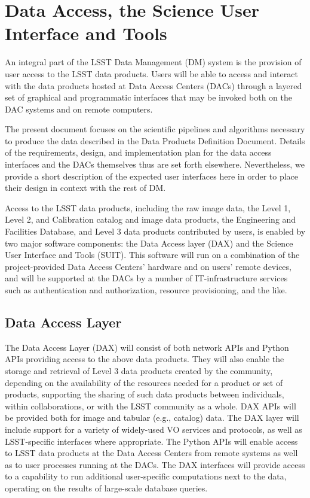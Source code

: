 \section{Data Access, the Science User Interface and Tools}
\label{sec:suit}

An integral part of the LSST Data Management (DM) system is the provision of user access to the 
LSST data products. Users will be able to access and interact with the data products hosted at 
Data Access Centers (DACs) through a layered set of graphical and programmatic interfaces that 
may be invoked both on the DAC systems and on remote computers.

The present document focuses on the scientific pipelines and algorithms necessary to produce 
the data described in the Data Products Definition Document. Details of the requirements, design, 
and implementation plan for the data access interfaces and the DACs themselves thus are set forth 
elsewhere. Nevertheless, we provide a short description of the expected user interfaces here in order 
to place their design in context with the rest of DM.

Access to the LSST data products, including the raw image data, the Level 1, Level 2, and Calibration 
catalog and image data products, the Engineering and Facilities Database, and Level 3 data products 
contributed by users, is enabled by two major software components: the Data Access layer (DAX) and 
the Science User Interface and Tools (SUIT). This software will run on a combination of the 
project-provided Data Access Centers' hardware and on users' remote devices, and will be supported 
at the DACs by a number of IT-infrastructure services such as authentication and authorization, 
resource provisioning, and the like.

\subsection{Data Access Layer} 

The Data Access Layer (DAX) will consist of both network APIs and Python APIs providing access to 
the above data products. They will also enable the storage and retrieval of Level 3 data products created 
by the community, depending on the availability of the resources needed for a product or set of products, 
supporting the sharing of such data products between individuals, within collaborations, or with the 
LSST community as a whole. DAX APIs will be provided both for image and tabular (e.g., catalog) data. 
The DAX layer will include support for a variety of widely-used VO services and protocols, as well as 
LSST-specific interfaces where appropriate. The Python APIs will enable access to LSST data products 
at the Data Access Centers from remote systems as well as to user processes running at the DACs. 
The DAX interfaces will provide access to a capability to run additional user-specific computations next 
to the data, operating on the results of large-scale database queries.

